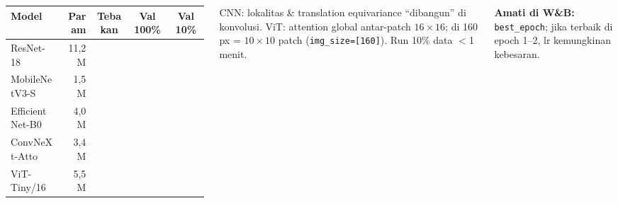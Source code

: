 \documentclass[t,aspectratio=169,xcolor={dvipsnames,table}]{beamer}
\begin{document}
\begin{frame}
\begin{columns}[T]
        \vspace{2pt}
        \scriptsize
        \setlength{\tabcolsep}{4pt}
        \renewcommand{\arraystretch}{1.55}
        \begin{tabular}{|l|r|c|c|c|}
            \rowcolor{dlSoftCloud} \textbf{Model} & \textbf{Param} & \textbf{Tebakan} & \textbf{Val 100\%} & \textbf{Val 10\%} \\ \hline
            ResNet-18 & 11,2 M & \hspace{0.75cm} & \hspace{0.75cm} & \hspace{0.75cm} \\ \hline
            MobileNetV3-S & 1,5 M & \hspace{0.75cm} & \hspace{0.75cm} & \hspace{0.75cm} \\ \hline
            EfficientNet-B0 & 4,0 M & \hspace{0.75cm} & \hspace{0.75cm} & \hspace{0.75cm} \\ \hline
            ConvNeXt-Atto & 3,4 M & \hspace{0.75cm} & \hspace{0.75cm} & \hspace{0.75cm} \\ \hline
            ViT-Tiny/16 & 5,5 M & \hspace{0.75cm} & \hspace{0.75cm} & \hspace{0.75cm} \\ \hline
        \end{tabular}

        \vspace{0.12cm}
        {\scriptsize CNN: lokalitas \& translation equivariance ``dibangun'' di konvolusi. ViT: attention global antar-patch $16\times16$; di 160 px = $10\times10$ patch (\texttt{img\_size=[160]}). Run 10\% data $<$1 menit.}

        \vspace{0.1cm}
        {\scriptsize\color{dlMute} \textbf{Amati di W\&B:} \texttt{best\_epoch}; jika terbaik di epoch 1--2, lr kemungkinan kebesaran.}
    \end{columns}
\end{frame}
\end{document}

